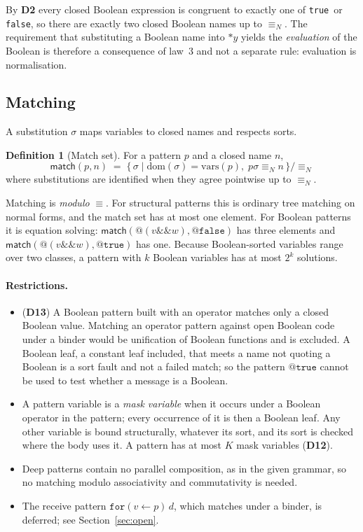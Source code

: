 \documentclass[11pt]{article}
\makeatletter
\newcommand{\kw}[1]{\texttt{#1}}
\newcommand{\tru}{\kw{true}}
\newcommand{\fls}{\kw{false}}
\newcommand{\band}{\mathbin{\&\&}}
\newcommand{\quo}[1]{@#1}
\newcommand{\drp}[1]{{*}#1}
\newcommand{\for}[3]{\kw{for}(#1 \leftarrow #2)\,#3}
\newcommand{\scong}{\equiv}
\newcommand{\nameq}{\equiv_N}
\newcommand{\dec}[1]{\textbf{D#1}}
\theoremstyle{definition}
\newtheorem{definition}{Definition}
\theoremstyle{remark}
\makeatother
\begin{document}
By \dec{2} every closed Boolean expression is congruent to exactly one of
\tru\ or \fls, so there are exactly two closed Boolean names up to $\nameq$.
The requirement that substituting a Boolean name into $\drp{y}$ yields the
\emph{evaluation} of the Boolean is therefore a consequence of law~3 and not
a separate rule: evaluation is normalisation.

\subsection{Matching}\label{sec:matching}

A substitution $\sigma$ maps variables to closed names and respects sorts.
\begin{definition}[Match set]
For a pattern $p$ and a closed name $n$,
\[
\mathsf{match}(p,n) \;=\; \{\, \sigma \mid \mathrm{dom}(\sigma)=\mathrm{vars}(p),\;
p\sigma \nameq n \,\}\big/{\nameq}
\]
where substitutions are identified when they agree pointwise up to $\nameq$.
\end{definition}
Matching is \emph{modulo} $\scong$. For structural patterns this is ordinary
tree matching on normal forms, and the match set has at most one element. For
Boolean patterns it is equation solving: $\mathsf{match}(\quo{(v \band w)},
\quo{\fls})$ has three elements and $\mathsf{match}(\quo{(v \band w)},
\quo{\tru})$ has one. Because Boolean-sorted variables range over two classes,
a pattern with $k$ Boolean variables has at most $2^k$ solutions.

\paragraph{Restrictions.}
\begin{itemize}
\item (\dec{13}) A Boolean pattern built with an operator matches only a
closed Boolean value. Matching an operator pattern against open Boolean code
under a binder would be unification of Boolean functions and is excluded. A Boolean
leaf, a constant leaf included, that meets a name not quoting a Boolean is a
sort fault and not a failed match; so the pattern $\quo{\tru}$ cannot be used
to test whether a message is a Boolean.
\item A pattern variable is a \emph{mask variable} when it occurs under a
Boolean operator in the pattern; every occurrence of it is then a Boolean
leaf. Any other variable is bound structurally, whatever its sort, and its
sort is checked where the body uses it. A pattern has at most $K$ mask
variables (\dec{12}).
\item Deep patterns contain no parallel composition, as in the given
grammar, so no matching modulo associativity and commutativity is needed.
\item The receive pattern $\for{v}{p}{d}$, which matches under a binder, is
deferred; see Section~\ref{sec:open}.
\end{itemize}
\end{document}
